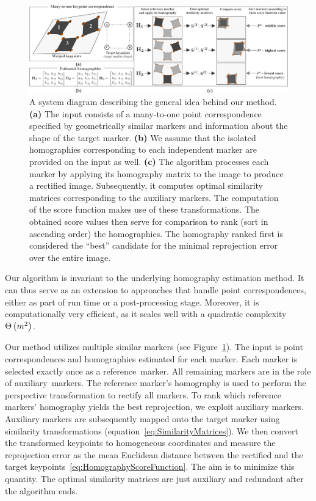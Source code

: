 \begin{figure}[t]
    \centerline{\includegraphics[width=\linewidth]{figures/homography/system_diagram.pdf}}
    \caption[Homography ranking system diagram]{A system diagram describing the general idea behind our method. \textbf{(a)} The input consists of a many-to-one point correspondence specified by geometrically similar markers and information about the shape of the target marker. \textbf{(b)} We assume that the isolated homographies corresponding to each independent marker are provided on the input as well. \textbf{(c)} The algorithm processes each marker by applying its homography matrix to the image to produce a rectified image. Subsequently, it computes optimal similarity matrices corresponding to the auxiliary markers. The computation of the score function makes use of these transformations. The obtained score values then serve for comparison to rank (sort in ascending order) the homographies. The homography ranked first is considered the ``best'' candidate for the minimal reprojection error over the entire image.}
    \label{fig:HomographySystemDiagram}
\end{figure}

Our algorithm is invariant to the underlying homography estimation method. It can thus serve as an extension to approaches that handle point correspondences, either as part of run time or a post-processing stage. Moreover, it is computationally very efficient, as it scales well with a quadratic complexity ${\Theta} \left( m^2 \right)$.

Our method utilizes multiple similar markers (see Figure~\ref{fig:HomographySystemDiagram}). The input is point correspondences and homographies estimated for each marker. Each marker is selected exactly once as a \mbox{reference marker}. All remaining markers are in the role of \mbox{auxiliary markers}. The reference marker's homography is used to perform the perspective transformation to rectify all markers. To rank which reference markers' homography yields the best reprojection, we exploit auxiliary markers. Auxiliary markers are subsequently mapped onto the target marker using similarity transformations (equation~\eqref{eq:SimilarityMatrices}). We then convert the transformed keypoints to homogeneous coordinates and measure the reprojection error as the mean Euclidean distance between the rectified and the target keypoints~\eqref{eq:HomographyScoreFunction}. The aim is to minimize this quantity. The optimal similarity matrices are just auxiliary and redundant after the algorithm ends.

